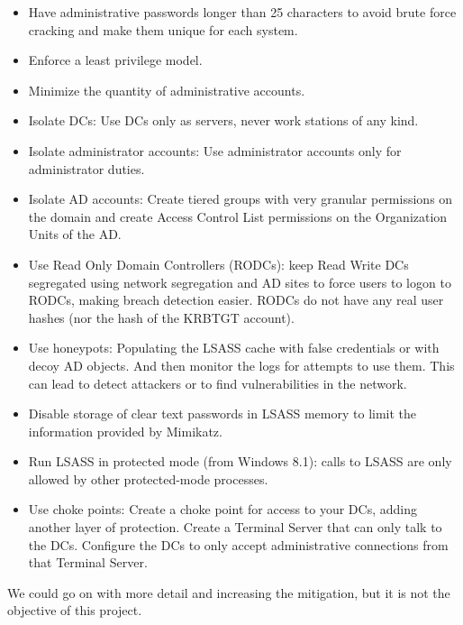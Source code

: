 \begin{itemize}
	\item Have administrative passwords longer than 25 characters to avoid brute force cracking and make them unique for each system.
	\item Enforce a least privilege model.
	\item Minimize the quantity of administrative accounts.
	\item Isolate DCs: Use DCs only as servers, never work stations of any kind.
	\item Isolate administrator accounts: Use administrator accounts only for administrator duties.
	\item Isolate AD accounts: Create tiered groups with very granular permissions on the domain and create Access Control List permissions on the Organization Units of the AD\cite{AD_tier}.
	\item Use Read Only Domain Controllers (RODCs): keep Read Write DCs segregated using network segregation and AD sites to force users to logon to RODCs, making breach detection easier. RODCs do not have any real user hashes (nor the hash of the KRBTGT account)\cite{hood}\cite{reset_RODC}.
	\item Use honeypots: Populating the LSASS cache with false credentials\cite{SANS_mimikatz}\cite{honeyhashes} or with decoy AD objects\cite{decoy_AD}. And then monitor the logs for attempts to use them. This can lead to detect attackers or to find vulnerabilities in the network.
	\item Disable storage of clear text passwords in LSASS memory to limit the information provided by Mimikatz\cite{SANS_mimikatz}.
	\item Run LSASS in protected mode (from Windows 8.1): calls to LSASS are only allowed by other protected-mode processes\cite{SANS_mimikatz}\cite{understanding_powersploit_mimikatz}.
	\item Use choke points: Create a choke point for access to your DCs, adding another layer of protection. Create a Terminal Server that can only talk to the DCs. Configure the DCs to only accept administrative connections from that Terminal Server\cite{choke}.
\end{itemize}
\linej
We could go on with more detail and increasing the mitigation\cite{AD_defense}, but it is not the objective of this project.

